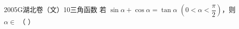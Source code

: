 
\begin{problem}{2005}{G}{湖北卷（文）}{10}{三角函数}
若 $\sin\alpha+\cos\alpha=\tan\alpha$ $(0<\alpha<\dfrac{\pi}{2})$，则 $\alpha\in$  （         ）

\begin{choices}
\end{choices}
\end{problem}